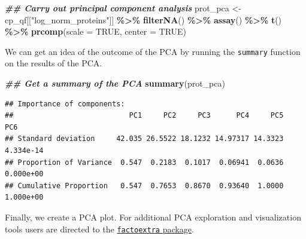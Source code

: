 \documentclass[9pt,a4paper,]{extarticle}
\newenvironment{Shaded}{\begin{snugshade}}{\end{snugshade}}
\newcommand{\AttributeTok}[1]{\textcolor[rgb]{0.13,0.29,0.53}{#1}}
\newcommand{\ConstantTok}[1]{\textcolor[rgb]{0.56,0.35,0.01}{#1}}
\newcommand{\DocumentationTok}[1]{\textcolor[rgb]{0.56,0.35,0.01}{\textbf{\textit{#1}}}}
\newcommand{\FunctionTok}[1]{\textcolor[rgb]{0.13,0.29,0.53}{\textbf{#1}}}
\newcommand{\NormalTok}[1]{#1}
\newcommand{\OtherTok}[1]{\textcolor[rgb]{0.56,0.35,0.01}{#1}}
\newcommand{\SpecialCharTok}[1]{\textcolor[rgb]{0.81,0.36,0.00}{\textbf{#1}}}
\newcommand{\StringTok}[1]{\textcolor[rgb]{0.31,0.60,0.02}{#1}}
\begin{document}
\begin{Shaded}
\begin{Highlighting}[]
\DocumentationTok{\#\# Carry out principal component analysis}
\NormalTok{prot\_pca }\OtherTok{\textless{}{-}}\NormalTok{ cp\_qf[[}\StringTok{"log\_norm\_proteins"}\NormalTok{]] }\SpecialCharTok{\%\textgreater{}\%}
  \FunctionTok{filterNA}\NormalTok{() }\SpecialCharTok{\%\textgreater{}\%}
  \FunctionTok{assay}\NormalTok{() }\SpecialCharTok{\%\textgreater{}\%}
  \FunctionTok{t}\NormalTok{() }\SpecialCharTok{\%\textgreater{}\%}
  \FunctionTok{prcomp}\NormalTok{(}\AttributeTok{scale =} \ConstantTok{TRUE}\NormalTok{, }\AttributeTok{center =} \ConstantTok{TRUE}\NormalTok{)}
\end{Highlighting}
\end{Shaded}

We can get an idea of the outcome of the PCA by running the \texttt{summary} function
on the results of the PCA.

\begin{Shaded}
\begin{Highlighting}[]
\DocumentationTok{\#\# Get a summary of the PCA}
\FunctionTok{summary}\NormalTok{(prot\_pca)}
\end{Highlighting}
\end{Shaded}

\begin{verbatim}
## Importance of components:
##                           PC1     PC2     PC3      PC4     PC5       PC6
## Standard deviation     42.035 26.5522 18.1232 14.97317 14.3323 4.334e-14
## Proportion of Variance  0.547  0.2183  0.1017  0.06941  0.0636 0.000e+00
## Cumulative Proportion   0.547  0.7653  0.8670  0.93640  1.0000 1.000e+00
\end{verbatim}

Finally, we create a PCA plot. For additional PCA exploration and visualization
tools users are directed to the \href{https://cran.r-project.org/web/packages/factoextra/index.html}{\texttt{factoextra} package}.
\end{document}
